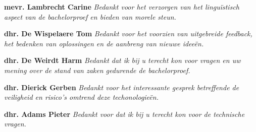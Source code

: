 \begin{center}
	
		\large{\textbf{mevr. Lambrecht Carine}}\newline
	\textit{Bedankt voor het verzorgen van het lingu\"istisch aspect van de bachelorproef en bieden van morele steun.}\newline
	
		\large{\textbf{dhr. De Wispelaere Tom}}\newline
	\textit{Bedankt voor het voorzien van uitgebreide feedback, het bedenken van oplossingen en de aanbreng van nieuwe idee\"en.}\newline
	
			\large{\textbf{dhr. De Weirdt Harm}}\newline
	\textit{Bedankt dat ik bij u terecht kon voor vragen en uw mening over de stand van zaken gedurende de bachelorproef.}\newline
	
		\large{\textbf{dhr. Dierick Gerben}}\newline
	\textit{Bedankt voor het interessante gesprek betreffende de veiligheid en risico's omtrend deze techonologie\"en.}\newline
	
		\large{\textbf{dhr. Adams Pieter}}\newline
	\textit{Bedankt voor dat ik bij u terecht kon voor de technische vragen.}\newline
	

	

	
	
	
	
		
		
\end{center}